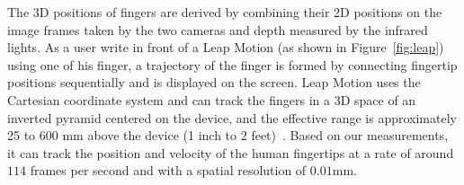  The 3D positions of fingers are derived by combining their 2D positions on the image frames taken by the two cameras and depth measured by the infrared lights. 
As a user write in front of a Leap Motion (as shown in Figure~\ref{fig:leap}) using one of his finger, %
a trajectory of the finger is formed by connecting fingertip positions sequentially and is displayed on the screen.
Leap Motion uses the Cartesian coordinate system and can track the fingers in a 3D space of an inverted pyramid centered on the device, and the effective range is approximately 25 to 600 mm above the device (1 inch to 2 feet)~\cite{LeapOnlineOverview,leapBlog}.
Based on our measurements, it can track the position and velocity of the human fingertips at a rate of around $114$ frames per second and with a spatial resolution of $0.01$mm.






